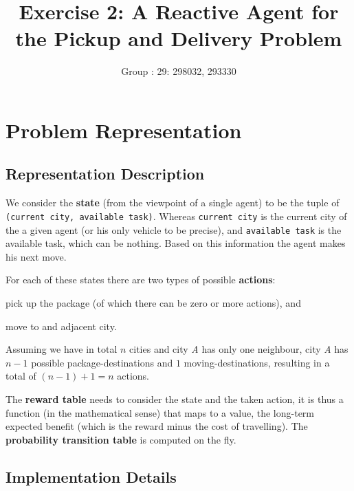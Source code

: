 \documentclass[11pt]{article}
\title{\bf Exercise 2: A Reactive Agent for the Pickup and Delivery Problem}
\author{Group \textnumero: 29: 298032, 293330}
\begin{document}
\maketitle

\section{Problem Representation}

\subsection{Representation Description}

We consider the \textbf{state} (from the viewpoint of a single agent) to be the tuple of \texttt{(current city, available task)}. Whereas \texttt{current city} is the current city of the a given agent (or his only vehicle to be precise), and \texttt{available task} is the available task, which can be nothing. Based on this information the agent makes his next move.

For each of these states there are two types of possible \textbf{actions}:
\begin{enumerate*}[label={\alph*)}]
\item pick up the package (of which there can be zero or more actions), and
\item move to and adjacent city.
\end{enumerate*}
Assuming we have in total $n$ cities and city \textit{A} has only one neighbour, city \textit{A} has $n - 1$ possible package-destinations and $1$ moving-destinations, resulting in a total of $(n - 1) + 1 = n$ actions.

The \textbf{reward table} needs to consider the state and the taken action, it is thus a function (in the mathematical sense) that maps to a value, the long-term expected benefit (which is the reward minus the cost of travelling).
The \textbf{probability transition table} is computed on the fly.

\subsection{Implementation Details}
\end{document}
